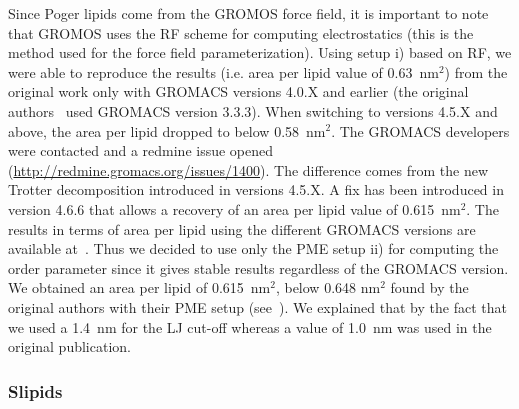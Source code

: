 \documentclass[pre,aps,floatfix,authordate1-4,twocolumn]{revtex4-1}
\begin{document}
Since Poger lipids come from the GROMOS force field, it is important to note that GROMOS uses the RF scheme for computing electrostatics (this is the method used for the 
force field parameterization). Using setup i) based on RF, we were able to reproduce the results (i.e. area per lipid value of 0.63~nm$^2$) from the original work only with 
GROMACS versions 4.0.X and earlier (the original authors~\cite{poger10} used GROMACS version 3.3.3). When switching to versions 4.5.X and above, the area per lipid dropped to below 0.58~nm$^2$. 
The GROMACS developers were contacted and a redmine issue opened (\url{http://redmine.gromacs.org/issues/1400}). The difference comes from the new Trotter decomposition 
introduced in versions 4.5.X. A fix has been introduced in version 4.6.6 that allows a recovery of an area per lipid value of 0.615~nm$^2$. The results in terms of area per lipid using the different 
GROMACS versions are available at~\cite{pogerFILESrf2}.
Thus we decided to use only the PME setup ii) for computing the order parameter since it gives stable results regardless of the GROMACS version. We obtained an area per 
lipid of 0.615~nm$^2$, below 0.648 nm$^2$ found by the original authors with their PME setup (see~\cite{poger12}). We explained that by the fact that we used 
a 1.4~nm for the LJ cut-off whereas a value of 1.0~nm was used in the original publication. 

\subsubsection{Slipids}
\end{document}
